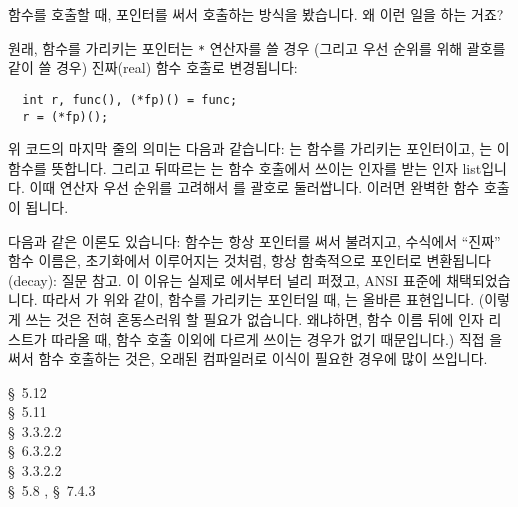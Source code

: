 \begin{faq}
	함수를 호출할 때, 포인터를 써서 호출하는 방식을 봤습니다.
	왜 이런 일을 하는 거죠?

\A	원래, 함수를 가리키는 포인터는 \verb+*+ 연산자를 쓸 경우 (그리고
	우선 순위를 위해 괄호를 같이 쓸 경우) 진짜(real) 함수 호출로
	변경됩니다:

\begin{verbatim}
  int r, func(), (*fp)() = func;
  r = (*fp)();
\end{verbatim}
        위 코드의 마지막 줄의 의미는 다음과 같습니다: 는 함수를 가리키는 포인터이고,
        는 이 함수를 뜻합니다. 그리고 뒤따르는 \TT{()}는 함수 호출에서 쓰이는 
        인자를 받는 인자 list입니다. 이때 연산자 우선 순위를 고려해서 를 괄호로
        둘러쌉니다. 이러면 완벽한 함수 호출이 됩니다.

        다음과 같은 이론도 있습니다:
        함수는 항상 포인터를 써서 불려지고, 수식에서 ``진짜'' 함수 이름은, 초기화에서
        이루어지는 것처럼, 항상 함축적으로 포인터로 변환됩니다 (decay): 질문  참고.
        이 이유는 실제로 에서부터 널리 퍼졌고, ANSI 표준에 채택되었습니다. 따라서
        가 위와 같이, 함수를 가리키는 포인터일 때, 는 올바른
        표현입니다. (이렇게 쓰는 것은 전혀 혼동스러워 할 필요가 없습니다. 왜냐하면, 함수 이름
        뒤에 인자 리스트가 따라올 때, 함수 호출 이외에 다르게 쓰이는 경우가 없기 때문입니다.)
        직접 \TT{*}을 써서 함수 호출하는 것은, 오래된 컴파일러로 이식이 필요한 경우에 많이
        쓰입니다.


\R	\cite{kr1} \S\ 5.12  \\
	\cite{kr2} \S\ 5.11  \\
        \cite{ansi} \S\ 3.3.2.2 \\
	\cite{c89} \S\ 6.3.2.2 \\
	\cite{rationale} \S\ 3.3.2.2 \\
	\cite{hs} \S\ 5.8 , \S\ 7.4.3 
\end{faq}

